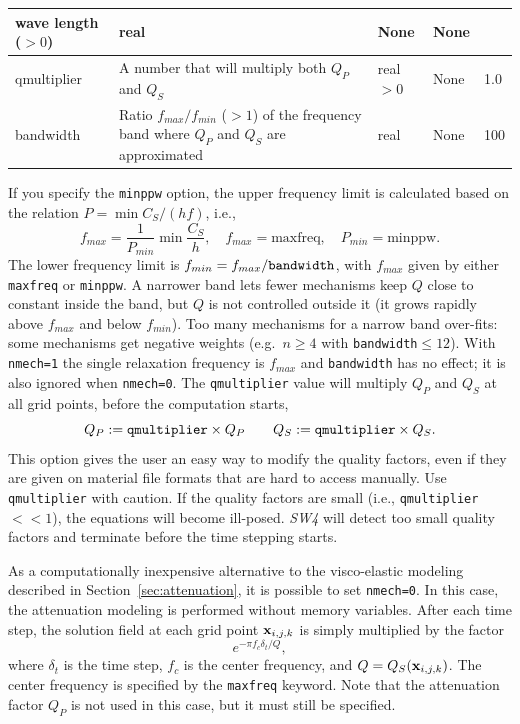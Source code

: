 \documentclass[11pt]{report}
\newcommand{\xb}{{\bf x}}
\begin{document}
{\begin{center}
\begin{tabular}{|l|p{8cm}|l|l|l|}
		wave length ($>0$) & real                                                                                 & None      & None                     \\ \hline
		qmultiplier        & A number that will multiply both $Q_P$ and $Q_S$                                     & real$>0$  & None      & 1.0          \\ \hline
		bandwidth          & Ratio $f_{max}/f_{min}$ ($>1$) of the frequency band where $Q_P$ and $Q_S$ are approximated & real & None & 100 \\ \hline
	\end{tabular}
\end{center}
If you specify the \verb+minppw+ option, the upper frequency limit is calculated based on the
relation $P=\min C_S/(h f)$, i.e.,
\[
	f_{max} = \frac{1}{P_{min}}\min \frac{C_S}{h},\quad f_{max} = \mbox{maxfreq},\quad P_{min}=\mbox{minppw}.
\]
The lower frequency limit is $f_{min} = f_{max}/{\tt bandwidth}$, with $f_{max}$ given by either
\verb+maxfreq+ or \verb+minppw+. A narrower band lets fewer mechanisms keep $Q$ close to constant
inside the band, but $Q$ is not controlled outside it (it grows rapidly above $f_{max}$ and below
$f_{min}$). Too many mechanisms for a narrow band over-fits: some mechanisms get negative weights
(e.g.\ $n\geq 4$ with {\tt bandwidth}$\leq 12$). With \verb+nmech=1+ the single relaxation frequency
is $f_{max}$ and \verb+bandwidth+ has no effect; it is also ignored when \verb+nmech=0+.
The {\tt qmultiplier} value will multiply $Q_P$ and $Q_S$ at all grid points, before the computation starts,
\[
	Q_P := {\tt qmultiplier} \times Q_P\qquad Q_S := {\tt qmultiplier} \times Q_S.
\]
This option gives the user an easy way to modify the quality factors, even if they are given on
material file formats that are hard to access manually. Use {\tt qmultiplier} with caution. If the
quality factors are small (i.e., {\tt qmultiplier}$<<1$), the equations will become
ill-posed. \emph{SW4} will detect too small quality factors and terminate before the time stepping
starts.

As a computationally inexpensive alternative to the visco-elastic modeling described in
Section~\ref{sec:attenuation}, it is possible to set \verb+nmech=0+. In this case, the attenuation
modeling is performed without memory variables. After each time step, the solution field at each
grid point $\xb_{i,j,k}$ is simply multiplied by the factor
\[
	e^{-\pi f_c \delta_t/Q},
\]
where $\delta_t$ is the time step, $f_c$ is the center frequency, and $Q=Q_S(\xb_{i,j,k})$. The
center frequency is specified by the \verb+maxfreq+ keyword. Note that the attenuation factor $Q_P$
is not used in this case, but it must still be specified.


}
\end{document}
